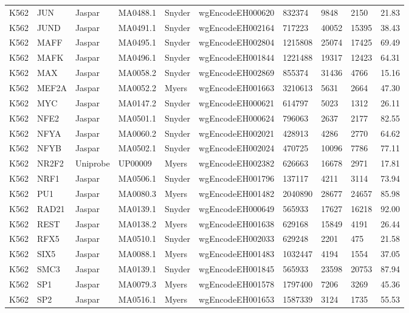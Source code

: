 {\begin{longtable}{p{1.1cm}p{1.0cm}p{1.0cm}p{1.0cm}p{1.0cm}p{2.3cm}p{1.0cm}p{0.8cm}p{0.8cm}p{0.8cm}}
K562 & JUN & Jaspar & MA0488.1 & Snyder & wgEncodeEH000620 & 832374 & 9848 & 2150 & 21.83\\
K562 & JUND & Jaspar & MA0491.1 & Snyder & wgEncodeEH002164 & 717223 & 40052 & 15395 & 38.43\\
K562 & MAFF & Jaspar & MA0495.1 & Snyder & wgEncodeEH002804 & 1215808 & 25074 & 17425 & 69.49\\
K562 & MAFK & Jaspar & MA0496.1 & Snyder & wgEncodeEH001844 & 1221488 & 19317 & 12423 & 64.31\\
K562 & MAX & Jaspar & MA0058.2 & Snyder & wgEncodeEH002869 & 855374 & 31436 & 4766 & 15.16\\
K562 & MEF2A & Jaspar & MA0052.2 & Myers & wgEncodeEH001663 & 3210613 & 5631 & 2664 & 47.30\\
K562 & MYC & Jaspar & MA0147.2 & Snyder & wgEncodeEH000621 & 614797 & 5023 & 1312 & 26.11\\
K562 & NFE2 & Jaspar & MA0501.1 & Snyder & wgEncodeEH000624 & 796063 & 2637 & 2177 & 82.55\\
K562 & NFYA & Jaspar & MA0060.2 & Snyder & wgEncodeEH002021 & 428913 & 4286 & 2770 & 64.62\\
K562 & NFYB & Jaspar & MA0502.1 & Snyder & wgEncodeEH002024 & 470725 & 10096 & 7786 & 77.11\\
K562 & NR2F2 & Uniprobe & UP00009 & Myers & wgEncodeEH002382 & 626663 & 16678 & 2971 & 17.81\\
K562 & NRF1 & Jaspar & MA0506.1 & Snyder & wgEncodeEH001796 & 137117 & 4211 & 3114 & 73.94\\
K562 & PU1 & Jaspar & MA0080.3 & Myers & wgEncodeEH001482 & 2040890 & 28677 & 24657 & 85.98\\
K562 & RAD21 & Jaspar & MA0139.1 & Snyder & wgEncodeEH000649 & 565933 & 17627 & 16218 & 92.00\\
K562 & REST & Jaspar & MA0138.2 & Myers & wgEncodeEH001638 & 629168 & 15849 & 4191 & 26.44\\
K562 & RFX5 & Jaspar & MA0510.1 & Snyder & wgEncodeEH002033 & 629248 & 2201 & 475 & 21.58\\
K562 & SIX5 & Jaspar & MA0088.1 & Myers & wgEncodeEH001483 & 1032447 & 4194 & 1554 & 37.05\\
K562 & SMC3 & Jaspar & MA0139.1 & Snyder & wgEncodeEH001845 & 565933 & 23598 & 20753 & 87.94\\
K562 & SP1 & Jaspar & MA0079.3 & Myers & wgEncodeEH001578 & 1797400 & 7206 & 3269 & 45.36\\
K562 & SP2 & Jaspar & MA0516.1 & Myers & wgEncodeEH001653 & 1587339 & 3124 & 1735 & 55.53\\

\end{longtable}}
